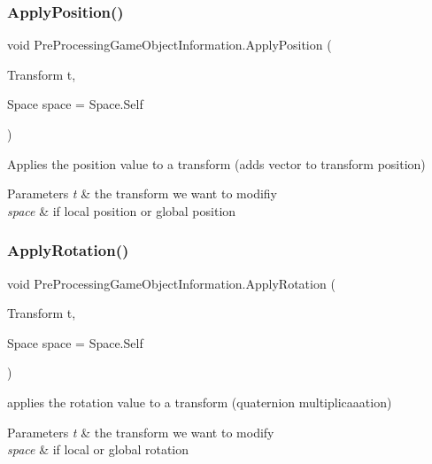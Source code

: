 \subsubsection{\texorpdfstring{Apply\+Position()}{ApplyPosition()}}
{\footnotesize\ttfamily void Pre\+Processing\+Game\+Object\+Information.\+Apply\+Position (\begin{DoxyParamCaption}\item[{Transform}]{t,  }\item[{Space}]{space = {\ttfamily Space.Self} }\end{DoxyParamCaption})}



Applies the position value to a transform (adds vector to transform position) 


\begin{DoxyParams}{Parameters}
{\em t} & the transform we want to modifiy\\
\hline
{\em space} & if local position or global position\\
\hline
\end{DoxyParams}
\mbox{\label{class_pre_processing_game_object_information_af252abe53894e441edc39890a6196901}} 
\subsubsection{\texorpdfstring{Apply\+Rotation()}{ApplyRotation()}}
{\footnotesize\ttfamily void Pre\+Processing\+Game\+Object\+Information.\+Apply\+Rotation (\begin{DoxyParamCaption}\item[{Transform}]{t,  }\item[{Space}]{space = {\ttfamily Space.Self} }\end{DoxyParamCaption})}



applies the rotation value to a transform (quaternion multiplicaaation) 


\begin{DoxyParams}{Parameters}
{\em t} & the transform we want to modify\\
\hline
{\em space} & if local or global rotation\\
\hline
\end{DoxyParams}
\mbox{\label{class_pre_processing_game_object_information_ae5ce78a8438afe10ba171442ea863c00}} 
